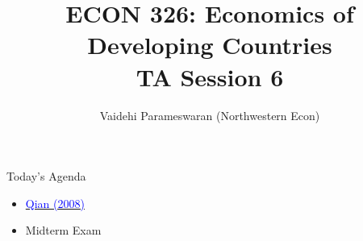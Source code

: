 \documentclass[11pt,notes=hide,aspectratio=169,mathserif]{beamer}
\title[class]{ECON 326: Economics of Developing Countries \\ TA Session 6}
\author[vaidehi's class ]{Vaidehi Parameswaran (Northwestern Econ)}
\date{\monthname[\the\month] \the\year}
\begin{document}
\begin{frame}[plain]
\titlepage
\end{frame}


\begin{frame}{Today's Agenda}

\begin{itemize}
\item \href{https://watermark.silverchair.com/123-3-1251.pdf?token=AQECAHi208BE49Ooan9kkhW_Ercy7Dm3ZL_9Cf3qfKAc485ysgAAA4MwggN_BgkqhkiG9w0BBwagggNwMIIDbAIBADCCA2UGCSqGSIb3DQEHATAeBglghkgBZQMEAS4wEQQM5oexR9-ezy51iFcTAgEQgIIDNvXO_WEQ2i7wsuSyrFh78JdyLp-nxQ69jjhzdxGYP3-y7cWm9HCEibHmZCw5vYxLPyLgMuYsZ4-LxYgQdiYZPK_zSeH6TFw9pInr2mJSOi2imv1wxlVSSWUiMou-Rp-U9FV6oNqdXRreflmIFwZKyFDIuFsoiN7pgwifThvGph3PMUb2qxD0UywfWjgf4rxeRPij6U49H7-Jin22nCEOW8ZTMHrRVtpVNmB4p3bwYwPzBwWfxoBwoQfd67OIvlZTpOD2C2XYpMAYjdPHyagmzHxCCTCLODnDBpEqpDls5XpdX24PJQ7H9PhBkEC4Qpa2DzDKKDZNgITi_otp491HJMc1GwAanJ-Uku_RgpBRy6cR4IG4FRZ3UCHa-Sh34UVVrOAVxZVaTTSMaE4733QHq_BeunEY17lRYOaj2zSgPpsXcvQ2L3X-bHXIIL2Sb5V0J7ZF7dXf0rI3Jl_jnPnSAxoYmVbIkyVRprv8YtB-P157Y3majgNT9RF4Cb3df1knyA1xOmLo02_a62Cl9Ye9murC4pUeU1S91DmM8dhRDO8JcN9qPyk2cekq1zjMm37TDzGEfWuOvaYZEES-jF-CAbUj8NgGULPQNLKm8rlje2vN6dEQJ8tSLncpAQHcs7qUqEyio0rnt_njur48ztBQkz8-7BowOICkn7jxg9PiVH03YrtkfezXh_WmvnB4zts9YUNcRIKpel0Z55OqPbUyr4iiXSdPTrS91JSzxMAwst5Antpju-nVDy4EGF9QITvHxsZH-VVpLRoxxQi8bdZHc_lIf6oxxMStsVnoeVX49L0EF_g5I1pazvMcPWNrjlfXGnvqELG9NvvBTHd00DGx9VK67F9T18soSQgJ8Mo1LNL8w20Ok_wY9EvFfDuYJ1GxGNPPN0u-pY-J2YFi9GI00KJ5mF6MDtkMCpikpf4zMhGdatHzfgJZO_DSxh3PMmEtQvvyfPWRfcMh7qxiOJbvuk614KWUsVNP1L7_DfQeeuN_4kOe8DdJ0DUtbsAsAtaR62L78jxemb0Ya1iLrUUbN7D9jwackNp4wZPFTfaC1_qXyHOgURoMQ_eUdI18Q1l1IGnhrZ4ZGQ}{\textcolor{blue}{Qian (2008)}}
\item Midterm Exam
\end{itemize}
\end{frame}
\end{document}
